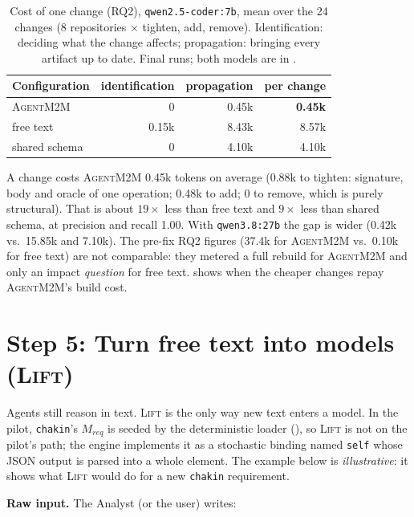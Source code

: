 \documentclass[10pt,a4paper]{article}
\newcommand{\tool}{\textsc{AgentM2M}}
\newcommand{\code}[1]{\texttt{#1}}
\theoremstyle{definition}
\newcommand{\what}[1]{\par\smallskip\noindent\textbf{#1}\quad}
\begin{document}
\begin{table}[h]
\centering\small
\caption{Cost of one change (RQ2), \texttt{qwen2.5-coder:7b}, mean over the
24 changes (8 repositories $\times$ tighten, add, remove). Identification:
deciding what the change affects; propagation: bringing every artifact up to
date. Final runs; both models are in .}
\label{tab:rq2tokens}
\begin{tabular}{@{}l r r r@{}}
\toprule
Configuration & identification & propagation & per change \\
\midrule
\tool{} & 0 & 0.45k & \textbf{0.45k} \\
free text & 0.15k & 8.43k & 8.57k \\
shared schema & 0 & 4.10k & 4.10k \\
\bottomrule
\end{tabular}
\end{table}

\noindent A change costs \tool{} 0.45k tokens on average (0.88k to tighten:
signature, body and oracle of one operation; 0.48k to add; 0 to remove,
which is purely structural). That is about $19\times$ less than free text
and $9\times$ less than shared schema, at precision and recall 1.00. With
\texttt{qwen3.8:27b} the gap is wider (0.42k vs.\ 15.85k and 7.10k). The
pre-fix RQ2 figures (37.4k for \tool{} vs.\ 0.10k for free text) are not
comparable: they metered a full rebuild for \tool{} and only an impact
\emph{question} for free text.  shows when the cheaper
changes repay \tool{}'s build cost.

\section{Step 5: Turn free text into models (\textsc{Lift})}\label{sec:step5}

Agents still reason in text. \textsc{Lift} is the only way new text enters a
model. In the pilot, \texttt{chakin}'s $M_{\mathit{req}}$ is seeded by the
deterministic loader (), so \textsc{Lift} is not on the pilot's
path; the engine implements it as a stochastic binding named \code{self}
whose JSON output is parsed into a whole element. The example below is
\emph{illustrative}: it shows what \textsc{Lift} would do for a new
\texttt{chakin} requirement.

\what{Raw input.} The Analyst (or the user) writes:
\end{document}

